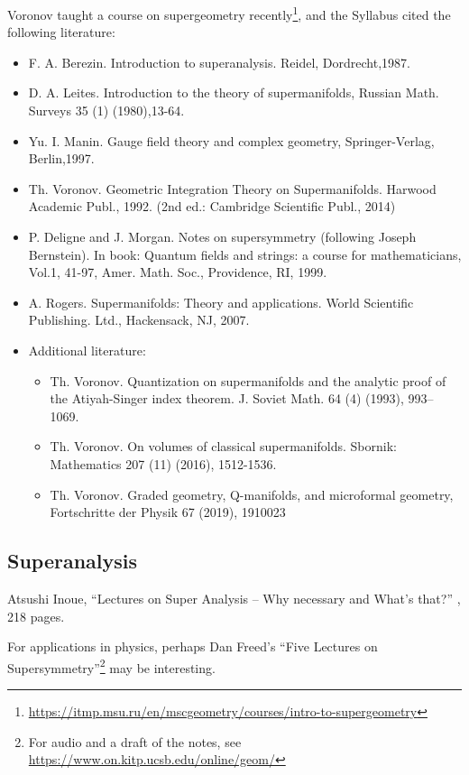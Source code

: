 Voronov taught a course on supergeometry recently\footnote{\url{https://itmp.msu.ru/en/mscgeometry/courses/intro-to-supergeometry}}, and the Syllabus
cited the following literature:
\begin{itemize}
\item F. A. Berezin. Introduction to superanalysis. Reidel, Dordrecht,1987.
\item D. A. Leites. Introduction to the theory of supermanifolds, Russian Math. Surveys 35 (1) (1980),13-64.
\item Yu. I. Manin. Gauge field theory and complex geometry, Springer-Verlag, Berlin,1997.
\item Th. Voronov. Geometric Integration Theory on Supermanifolds. Harwood Academic Publ., 1992. (2nd ed.: Cambridge Scientific Publ., 2014)
\item P. Deligne and J. Morgan. Notes on supersymmetry (following Joseph Bernstein). In book: Quantum fields and strings: a course for mathematicians, Vol.1, 41-97, Amer. Math. Soc., Providence, RI, 1999.
\item A. Rogers. Supermanifolds: Theory and applications. World Scientific Publishing. Ltd., Hackensack, NJ, 2007.
\item Additional literature:
  \begin{itemize}
  \item Th. Voronov.  Quantization on supermanifolds and the analytic proof of the Atiyah-Singer index theorem. J. Soviet Math. 64 (4) (1993),  993--1069.
  \item Th. Voronov. On volumes of  classical supermanifolds. Sbornik: Mathematics 207 (11) (2016), 1512-1536.
  \item Th. Voronov.  Graded geometry, Q-manifolds, and microformal geometry, Fortschritte der Physik 67 (2019), 1910023%
  \end{itemize}
\end{itemize}

\subsection{Superanalysis}

\begin{enumerate}[resume,label={[\arabic*]}]
\item Atsushi Inoue,
  ``Lectures on Super Analysis -- Why necessary and What's that?''
  , 218 pages.
\end{enumerate}
For applications in physics, perhaps Dan Freed's ``Five Lectures on Supersymmetry''\footnote{For
audio and a draft of the notes, see
\url{https://www.on.kitp.ucsb.edu/online/geom/}}
may be interesting.
